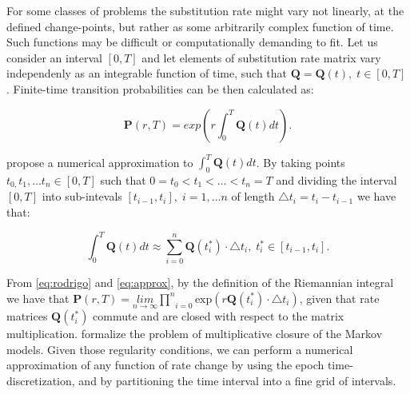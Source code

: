 For some classes of problems the substitution rate might vary not linearly, at the defined change-points, but rather as some arbitrarily complex function of time. 
Such functions may be difficult or computationally demanding to fit. 
Let us consider an interval $\left[0,T\right]$ and let elements of substitution rate matrix vary independenly as an integrable function of time, such that $\mathbf{Q}=\mathbf{Q}(t),\; t\in\left[0,T\right]$. 
Finite-time transition probabilities can be then calculated as: 

\begin{equation}
\ensuremath{\mathbf{P}}(r,T)=exp\left(r\int_{0}^{T}\mathbf{Q}(t)dt\right).\label{eq:rodrigo}
\end{equation}

\noindent
\citet{Rodrigo2008} propose a numerical approximation to $\int_{0}^{T}\mathbf{Q}(t)dt$. 
By taking points $t_{0,}t_{1},\ldots t_{n}\in[0,T]$ such that $0=t_{0}<t_{1}<\ldots<t_{n}=T$ and dividing the interval $\left[0,T\right]$ into sub-intevals $\left[t_{i-1},t_{i}\right],\; i=1,\ldots n$ of length $\triangle t_{i}=t_{i}-t_{i-1}$ we have that:   

\begin{equation}
\int_{0}^{T}\mathbf{Q}(t)dt\approx\underset{i=0}{\overset{n}{\sum}}\mathbf{Q}(t_{i}^{*})\cdot\triangle t_{i},\; t_{i}^{*}\in[t_{i-1},t_{i}].\label{eq:approx}
\end{equation}

\noindent
From \ref{eq:rodrigo} and \ref{eq:approx}, by the definition of the Riemannian integral we have that $\mathbf{P}(r,T)=\underset{n\rightarrow\infty}{lim}\underset{i=0}{\overset{n}{\prod}}\text{exp}\left(r\mathbf{Q}(t_{i}^{*})\cdot\triangle t_{i}\right)$, given that rate matrices $\mathbf{Q}(t_{i}^{*})$ commute 
and are closed with respect to the matrix multiplication.
\citet{Sumner2012} formalize the problem of multiplicative closure of the Markov models. 
Given those regularity conditions, we can perform a numerical approximation of any function of rate change by using the epoch time-discretization, and by partitioning the time interval into a fine grid of intervals. 


